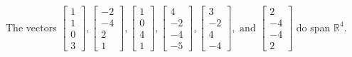 \begin{exercise}
\begin{exerciseStatement}
  \end{exerciseStatement}
  \begin{exerciseAnswer}
   The vectors \(\left[\begin{array}{r}
1 \\
1 \\
0 \\
3
\end{array}\right] , \left[\begin{array}{r}
-2 \\
-4 \\
2 \\
1
\end{array}\right] , \left[\begin{array}{r}
1 \\
0 \\
4 \\
1
\end{array}\right] , \left[\begin{array}{r}
4 \\
-2 \\
-4 \\
-5
\end{array}\right] , \left[\begin{array}{r}
3 \\
-2 \\
4 \\
-4
\end{array}\right] , \text{ and } \left[\begin{array}{r}
2 \\
-4 \\
-4 \\
2
\end{array}\right]\) 
  	 do  
	span \(\mathbb{R}^4\).
  


  \end{exerciseAnswer}
\end{exercise}